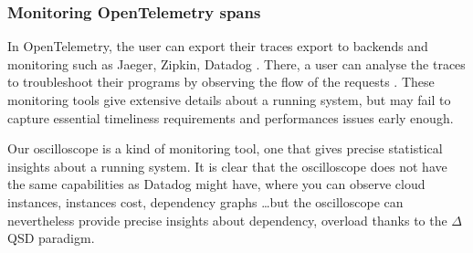     \subsubsection{Monitoring OpenTelemetry spans}
        In OpenTelemetry, the user can export their traces export to backends and monitoring such as Jaeger, Zipkin, Datadog \cite{otel-exp}. There, a user can analyse the traces to troubleshoot their programs by observing the flow of the requests \cite{jg}. These monitoring tools give extensive details about a running system, but may fail to capture essential timeliness requirements and performances issues early enough.
        
        Our oscilloscope is a kind of monitoring tool, one that gives precise statistical insights about a running system. It is clear that the oscilloscope does not have the same capabilities as Datadog \cite{datadog} might have, where you can observe cloud instances, instances cost, dependency graphs \dots but the oscilloscope can nevertheless provide precise insights about dependency, overload thanks to the $\Delta$QSD paradigm. 

